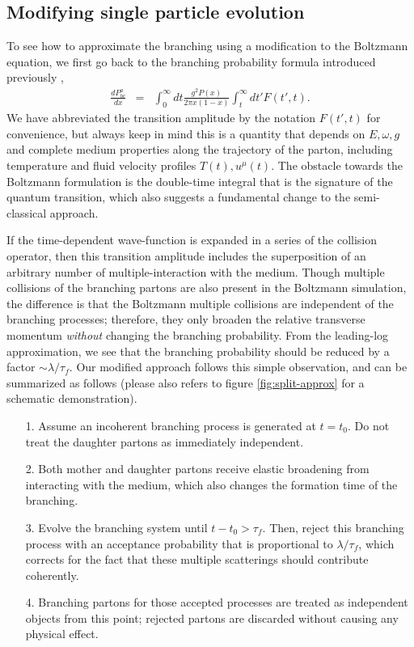 \subsection{Modifying single particle evolution}
To see how to approximate the branching using a modification to the Boltzmann equation, we first go back to the branching probability formula introduced previously \cite{CaronHuot:2010bp},
\begin{eqnarray}
\frac{dP^{a}_{bc}}{dx} &=& \int_0^\infty dt \frac{g^2 P(x)}{2\pi x (1-x) } \int_t^\infty dt'  F(t', t).
\label{eq:full-theory}
\end{eqnarray}
We have abbreviated the transition amplitude by the notation $F(t', t)$ for convenience, but always keep in mind this is a quantity that depends on $E, \omega, g$ and complete medium properties along the trajectory of the parton, including temperature and fluid velocity profiles $T(t), u^\mu(t)$.
The obstacle towards the Boltzmann formulation is the double-time integral that is the signature of the quantum transition, which also suggests a fundamental change to the semi-classical approach.

If the time-dependent wave-function is expanded in a series of the collision operator, then this transition amplitude includes the superposition of an arbitrary number of multiple-interaction with the medium.
Though multiple collisions of the branching partons are also present in the Boltzmann simulation, the difference is that the Boltzmann multiple collisions are independent of the branching processes; therefore, they only broaden the relative transverse momentum {\it without} changing the branching probability.
From the leading-log approximation, we see that the branching probability should be reduced by a factor $\sim \lambda/\tau_f$.
Our modified approach follows this simple observation, and can be summarized as follows (please also refers to figure \ref{fig:split-approx} for a schematic demonstration).
\begin{itemize}
\item[1.] Assume an incoherent branching process is generated at $t=t_0$. Do not treat the daughter partons as immediately independent.
\item[2.] Both mother and daughter partons receive elastic broadening from interacting with the medium, which also changes the formation time of the branching.
\item[3.] Evolve the branching system until $t-t_0 > \tau_f$. Then, reject this branching process with an acceptance probability that is proportional to $\lambda/\tau_f$, which corrects for the fact that these multiple scatterings should contribute coherently.
\item[4.] Branching partons for those accepted processes are treated as independent objects from this point; rejected partons are discarded without causing any physical effect.
\end{itemize}


